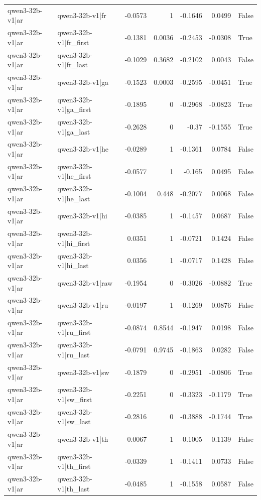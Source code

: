 \begin{table}
\begin{tabular}{l l r r r r l}
qwen3-32b-v1|ar & qwen3-32b-v1|fr & -0.0573 & 1 & -0.1646 & 0.0499 & False \\
qwen3-32b-v1|ar & qwen3-32b-v1|fr_first & -0.1381 & 0.0036 & -0.2453 & -0.0308 & True \\
qwen3-32b-v1|ar & qwen3-32b-v1|fr_last & -0.1029 & 0.3682 & -0.2102 & 0.0043 & False \\
qwen3-32b-v1|ar & qwen3-32b-v1|ga & -0.1523 & 0.0003 & -0.2595 & -0.0451 & True \\
qwen3-32b-v1|ar & qwen3-32b-v1|ga_first & -0.1895 & 0 & -0.2968 & -0.0823 & True \\
qwen3-32b-v1|ar & qwen3-32b-v1|ga_last & -0.2628 & 0 & -0.37 & -0.1555 & True \\
qwen3-32b-v1|ar & qwen3-32b-v1|he & -0.0289 & 1 & -0.1361 & 0.0784 & False \\
qwen3-32b-v1|ar & qwen3-32b-v1|he_first & -0.0577 & 1 & -0.165 & 0.0495 & False \\
qwen3-32b-v1|ar & qwen3-32b-v1|he_last & -0.1004 & 0.448 & -0.2077 & 0.0068 & False \\
qwen3-32b-v1|ar & qwen3-32b-v1|hi & -0.0385 & 1 & -0.1457 & 0.0687 & False \\
qwen3-32b-v1|ar & qwen3-32b-v1|hi_first & 0.0351 & 1 & -0.0721 & 0.1424 & False \\
qwen3-32b-v1|ar & qwen3-32b-v1|hi_last & 0.0356 & 1 & -0.0717 & 0.1428 & False \\
qwen3-32b-v1|ar & qwen3-32b-v1|raw & -0.1954 & 0 & -0.3026 & -0.0882 & True \\
qwen3-32b-v1|ar & qwen3-32b-v1|ru & -0.0197 & 1 & -0.1269 & 0.0876 & False \\
qwen3-32b-v1|ar & qwen3-32b-v1|ru_first & -0.0874 & 0.8544 & -0.1947 & 0.0198 & False \\
qwen3-32b-v1|ar & qwen3-32b-v1|ru_last & -0.0791 & 0.9745 & -0.1863 & 0.0282 & False \\
qwen3-32b-v1|ar & qwen3-32b-v1|sw & -0.1879 & 0 & -0.2951 & -0.0806 & True \\
qwen3-32b-v1|ar & qwen3-32b-v1|sw_first & -0.2251 & 0 & -0.3323 & -0.1179 & True \\
qwen3-32b-v1|ar & qwen3-32b-v1|sw_last & -0.2816 & 0 & -0.3888 & -0.1744 & True \\
qwen3-32b-v1|ar & qwen3-32b-v1|th & 0.0067 & 1 & -0.1005 & 0.1139 & False \\
qwen3-32b-v1|ar & qwen3-32b-v1|th_first & -0.0339 & 1 & -0.1411 & 0.0733 & False \\
qwen3-32b-v1|ar & qwen3-32b-v1|th_last & -0.0485 & 1 & -0.1558 & 0.0587 & False \\

\end{tabular}
\end{table}
